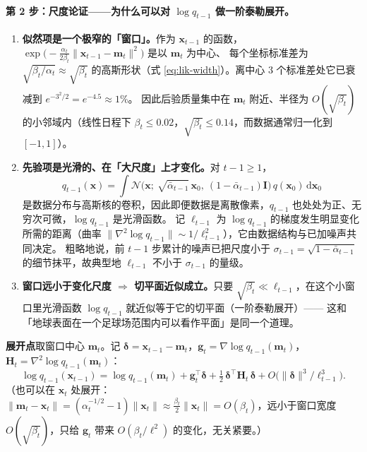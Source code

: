 \documentclass[a4paper,fontset=none,zihao=5]{ctexart}
\numberwithin{equation}{section}
\newcommand{\x}{\mathbf{x}}
\newcommand{\I}{\mathbf{I}}
\newcommand{\N}{\mathcal{N}}
\newcommand{\abar}{\bar{\alpha}}
\begin{document}
\paragraph{第 2 步：尺度论证——为什么可以对 $\log q_{t-1}$ 做一阶泰勒展开。}
\begin{enumerate}[leftmargin=1.6em,itemsep=2pt]
  \item \textbf{似然项是一个极窄的「窗口」。}作为 $\x_{t-1}$ 的函数，$\exp\!\big(-\frac{\alpha_t}{2\beta_t}\|\x_{t-1}-\mathbf{m}_t\|^2\big)$ 是以 $\mathbf{m}_t$ 为中心、
        每个坐标标准差为 $\sqrt{\beta_t/\alpha_t}\approx\sqrt{\beta_t}$ 的高斯形状（式 \eqref{eq:lik-width}）。离中心 3 个标准差处它已衰减到 $e^{-3^2/2}=e^{-4.5}\approx 1\%$。
        因此后验质量集中在 $\mathbf{m}_t$ 附近、半径为 $O(\sqrt{\beta_t})$ 的小邻域内（线性日程下 $\beta_t\le 0.02$，$\sqrt{\beta_t}\le 0.14$，而数据通常归一化到 $[-1,1]$）。
  \item \textbf{先验项是光滑的、在「大尺度」上才变化。}对 $t-1\ge 1$，
        \begin{equation}
          q_{t-1}(\x)=\int\N\!\big(\x;\ \sqrt{\abar_{t-1}}\,\x_0,\ (1-\abar_{t-1})\I\big)\,q(\x_0)\,\mathrm{d}\x_0
        \end{equation}
        是数据分布与高斯核的卷积，因此即便数据是离散像素，$q_{t-1}$ 也处处为正、无穷次可微，$\log q_{t-1}$ 是光滑函数。
        记 $\ell_{t-1}$ 为 $\log q_{t-1}$ 的梯度发生明显变化所需的距离（曲率 $\|\nabla^2\log q_{t-1}\|\sim 1/\ell_{t-1}^2$），它由数据结构与已加噪声共同决定。
        粗略地说，前 $t-1$ 步累计的噪声已把尺度小于 $\sigma_{t-1}=\sqrt{1-\abar_{t-1}}$ 的细节抹平，故典型地 $\ell_{t-1}$ 不小于 $\sigma_{t-1}$ 的量级。
  \item \textbf{窗口远小于变化尺度 $\Rightarrow$ 切平面近似成立。}只要 $\sqrt{\beta_t}\ll\ell_{t-1}$，在这个小窗口里光滑函数 $\log q_{t-1}$ 就近似等于它的切平面（一阶泰勒展开）——
        这和「地球表面在一个足球场范围内可以看作平面」是同一个道理。
\end{enumerate}
\textbf{展开点}取窗口中心 $\mathbf{m}_t$。记 $\boldsymbol{\delta}=\x_{t-1}-\mathbf{m}_t$，$\mathbf{g}_t=\nabla\log q_{t-1}(\mathbf{m}_t)$，$\mathbf{H}_t=\nabla^2\log q_{t-1}(\mathbf{m}_t)$：
\begin{equation}
  \log q_{t-1}(\x_{t-1})=\log q_{t-1}(\mathbf{m}_t)+\mathbf{g}_t^\top\boldsymbol{\delta}
  +\tfrac12\,\boldsymbol{\delta}^\top\mathbf{H}_t\,\boldsymbol{\delta}+O\!\big(\|\boldsymbol{\delta}\|^3/\ell_{t-1}^3\big).
  \label{eq:taylor-logq}
\end{equation}
（也可以在 $\x_t$ 处展开：$\|\mathbf{m}_t-\x_t\|=(\alpha_t^{-1/2}-1)\|\x_t\|\approx\frac{\beta_t}{2}\|\x_t\|=O(\beta_t)$，远小于窗口宽度 $O(\sqrt{\beta_t})$，只给 $\mathbf{g}_t$ 带来 $O(\beta_t/\ell^2)$ 的变化，无关紧要。）
\end{document}
